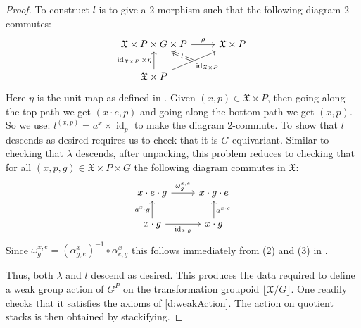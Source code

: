 \documentclass[12pt, final]{amsart}
\theoremstyle{remark}
\theoremstyle{definition}
\theoremstyle{plain}
\newcommand{\fX}{{\mathfrak X}}
\DeclareMathOperator{\id}{id}
\begin{document}
\begin{proof}
    To construct $l$ is to give a 2-morphism such that the following diagram 2-commutes:
    $$
    \begin{tikzcd}
        {\fX\times P \times G \times P} & {\fX \times P} \\
        {\fX \times P}
        \arrow["\rho", from=1-1, to=1-2]
        \arrow["\id_{\fX \times P} \times \eta", from=2-1, to=1-1]
        \arrow[""{name=0, anchor=center, inner sep=0}, "{\id_{\fX\times P}}"', from=2-1, to=1-2]
        \arrow["l"{description}, Rightarrow, from=0, to=1-1]
    \end{tikzcd} 
    $$ Here $\eta$ is the unit map as defined in .
    Given $(x,p) \in \fX \times P$, then going along the top path we get $(x\cdot e,p)$ and 
    going along the bottom path we get $(x,p)$. So we use:
    $l^{(x,p)} = a^{x} \times \id_p$ to make the diagram 2-commute.
    To show that $l$ descends as desired requires us to check that it is $G$-equivariant.
    Similar to checking that $\lambda$ descends, after unpacking, this problem reduces to checking
    that for all $(x,p,g) \in \fX \times P \times G$ the following diagram commutes in $\fX$:
    $$
    \begin{tikzcd}
        {x\cdot e \cdot g} & {x\cdot g \cdot e} \\
        {x\cdot g} & {x\cdot g}
        \arrow["{\omega_{g}^{x,e}}", from=1-1, to=1-2]
        \arrow["{a^{x}\cdot g}", from=2-1, to=1-1]
        \arrow["{\id_{x\cdot g}}"', from=2-1, to=2-2]
        \arrow["{a^{x\cdot g}}"', from=2-2, to=1-2]
    \end{tikzcd}
    $$
    Since $\omega_{g}^{x,e} = (\alpha_{g,e}^{x})^{-1}\circ\alpha_{e,g}^{x}$
    this follows immediately from (2) and (3) in .

    Thus, both $\lambda$ and $l$ descend as desired. This produces the data required to 
    define a weak group action of $G^P$ on the transformation groupoid $\lfloor \fX/G\rfloor$. 
    One readily checks that it satisfies the axioms of \ref{d:weakAction}. The 
    action on quotient stacks is then obtained by stackifying.
\end{proof}

    



\newpage


\printbibliography
\end{document}
